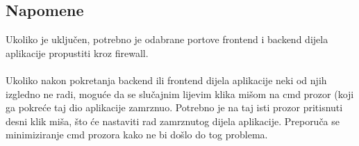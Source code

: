 			\subsection{Napomene}
			
			Ukoliko je uključen, potrebno je odabrane portove frontend i backend dijela aplikacije propustiti kroz firewall.\\\\
			Ukoliko nakon pokretanja backend ili frontend dijela aplikacije neki od njih izgledno ne radi, moguće da se slučajnim lijevim klika mišom na cmd prozor (koji ga pokreće taj dio aplikacije zamrznuo. Potrebno je na taj isti prozor pritisnuti desni klik miša, što će nastaviti rad zamrznutog dijela aplikacije. Preporuča se minimiziranje cmd prozora kako ne bi došlo do tog problema.
			
			
			\eject